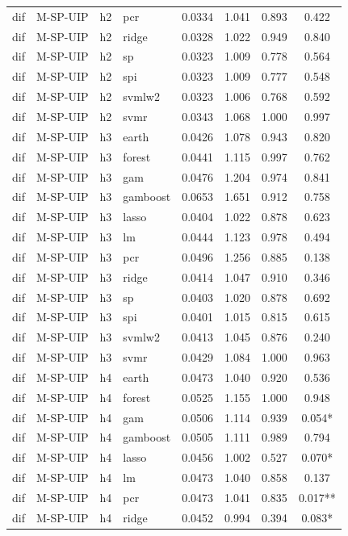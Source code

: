 \begin{ThreePartTable}
\begin{longtable}[t]{llclcccc}
dif & M-SP-UIP & h2 & pcr & 0.0334 & 1.041 & 0.893 & 0.422\\
dif & M-SP-UIP & h2 & ridge & 0.0328 & 1.022 & 0.949 & 0.840\\
dif & M-SP-UIP & h2 & sp & 0.0323 & 1.009 & 0.778 & 0.564\\
dif & M-SP-UIP & h2 & spi & 0.0323 & 1.009 & 0.777 & 0.548\\
dif & M-SP-UIP & h2 & svmlw2 & 0.0323 & 1.006 & 0.768 & 0.592\\
dif & M-SP-UIP & h2 & svmr & 0.0343 & 1.068 & 1.000 & 0.997\\
\addlinespace
dif & M-SP-UIP & h3 & earth & 0.0426 & 1.078 & 0.943 & 0.820\\
dif & M-SP-UIP & h3 & forest & 0.0441 & 1.115 & 0.997 & 0.762\\
dif & M-SP-UIP & h3 & gam & 0.0476 & 1.204 & 0.974 & 0.841\\
dif & M-SP-UIP & h3 & gamboost & 0.0653 & 1.651 & 0.912 & 0.758\\
dif & M-SP-UIP & h3 & lasso & 0.0404 & 1.022 & 0.878 & 0.623\\
dif & M-SP-UIP & h3 & lm & 0.0444 & 1.123 & 0.978 & 0.494\\
dif & M-SP-UIP & h3 & pcr & 0.0496 & 1.256 & 0.885 & 0.138\\
dif & M-SP-UIP & h3 & ridge & 0.0414 & 1.047 & 0.910 & 0.346\\
dif & M-SP-UIP & h3 & sp & 0.0403 & 1.020 & 0.878 & 0.692\\
dif & M-SP-UIP & h3 & spi & 0.0401 & 1.015 & 0.815 & 0.615\\
dif & M-SP-UIP & h3 & svmlw2 & 0.0413 & 1.045 & 0.876 & 0.240\\
dif & M-SP-UIP & h3 & svmr & 0.0429 & 1.084 & 1.000 & 0.963\\
\addlinespace
dif & M-SP-UIP & h4 & earth & 0.0473 & 1.040 & 0.920 & 0.536\\
dif & M-SP-UIP & h4 & forest & 0.0525 & 1.155 & 1.000 & 0.948\\
dif & M-SP-UIP & h4 & gam & 0.0506 & 1.114 & 0.939 & 0.054*\\
dif & M-SP-UIP & h4 & gamboost & 0.0505 & 1.111 & 0.989 & 0.794\\
dif & M-SP-UIP & h4 & lasso & 0.0456 & 1.002 & 0.527 & 0.070*\\
dif & M-SP-UIP & h4 & lm & 0.0473 & 1.040 & 0.858 & 0.137\\
dif & M-SP-UIP & h4 & pcr & 0.0473 & 1.041 & 0.835 & 0.017**\\
dif & M-SP-UIP & h4 & ridge & 0.0452 & 0.994 & 0.394 & 0.083*\\

\end{longtable}
\end{ThreePartTable}
